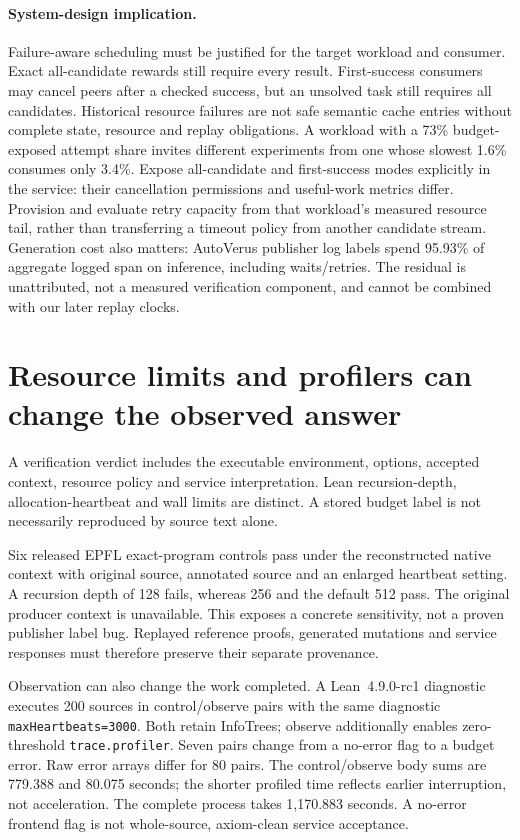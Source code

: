 \documentclass[10pt,twocolumn]{article}
\begin{document}
\paragraph{System-design implication.}
Failure-aware scheduling must be justified for the target workload and
consumer. Exact all-candidate rewards still require every result.
First-success consumers may cancel peers after a checked success, but an
unsolved task still requires all candidates. Historical resource failures
are not safe semantic cache entries without complete state, resource and
replay obligations.
A workload with a 73\% budget-exposed attempt share invites different
experiments from one whose slowest 1.6\% consumes only 3.4\%.
Expose all-candidate and first-success modes explicitly in the service:
their cancellation permissions and useful-work metrics differ. Provision
and evaluate retry capacity from that workload's measured resource tail,
rather than transferring a timeout policy from another candidate stream.
Generation cost also matters: AutoVerus publisher log labels spend
95.93\% of aggregate logged span on inference, including waits/retries.
The residual is unattributed, not a measured verification component, and
cannot be combined with our later replay clocks.

\section{Resource limits and profilers can change the observed answer}
\label{sec:reproducibility}
A verification verdict includes the executable environment, options,
accepted context, resource policy and service interpretation.
Lean recursion-depth, allocation-heartbeat and wall limits are distinct.
A stored budget label is not necessarily reproduced by source text alone.

Six released EPFL exact-program controls pass under the reconstructed
native context with original source, annotated source and an enlarged
heartbeat setting. A recursion depth of 128 fails, whereas 256 and the
default 512 pass. The original producer context is unavailable.
This exposes a concrete sensitivity, not a proven publisher label bug.
Replayed reference proofs, generated mutations and service responses must
therefore preserve their separate provenance.

Observation can also change the work completed.
A Lean~4.9.0-rc1 diagnostic executes 200 sources in control/observe pairs
with the same diagnostic \texttt{maxHeartbeats=3000}.
Both retain InfoTrees; observe additionally enables zero-threshold
\texttt{trace.profiler}. Seven pairs change from a no-error flag to a
budget error. Raw error arrays differ for 80 pairs.
The control/observe body sums are 779.388 and 80.075 seconds; the shorter
profiled time reflects earlier interruption, not acceleration.
The complete process takes 1,170.883 seconds.
A no-error frontend flag is not whole-source, axiom-clean service acceptance.
\end{document}
